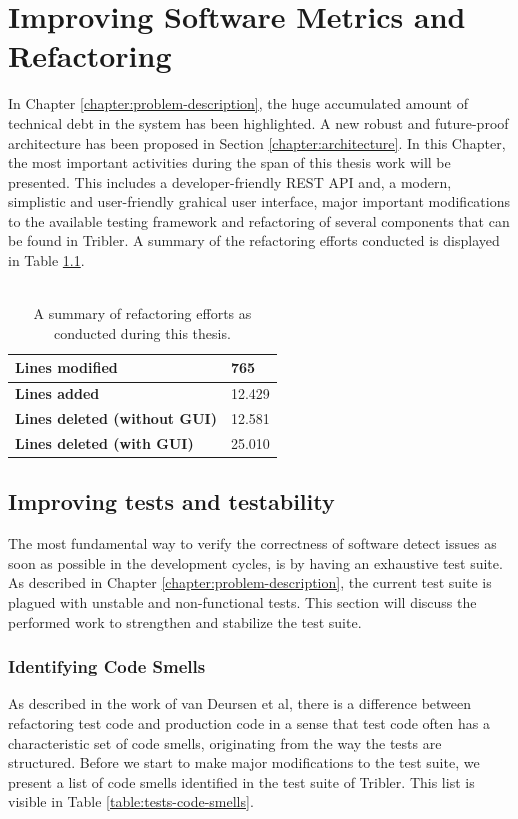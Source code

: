 \label{chapter:refactoring}
\chapter{Improving Software Metrics and Refactoring}
In Chapter \ref{chapter:problem-description}, the huge accumulated amount of technical debt in the system has been highlighted. A new robust and future-proof architecture has been proposed in Section \ref{chapter:architecture}. In this Chapter, the most important activities during the span of this thesis work will be presented. This includes a developer-friendly REST API and, a modern, simplistic and user-friendly grahical user interface, major important modifications to the available testing framework and refactoring of several components that can be found in Tribler. A summary of the refactoring efforts conducted is displayed in Table \ref{table:refactoring-summary}.\\\\

\begin{table}[h!]
	\centering
	\begin{tabular}{|l|l|}
		\hline
		\textbf{Lines modified} & 765 \\ \hline
		\textbf{Lines added} & 12.429 \\ \hline
		\textbf{Lines deleted (without GUI)} & 12.581 \\ \hline
		\textbf{Lines deleted (with GUI)} & 25.010 \\ \hline
	\end{tabular}
	\label{table:refactoring-summary}
	\caption{A summary of refactoring efforts as conducted during this thesis.}
\end{table}

\section{Improving tests and testability}
The most fundamental way to verify the correctness of software detect issues as soon as possible in the development cycles, is by having an exhaustive test suite. As described in Chapter \ref{chapter:problem-description}, the current test suite is plagued with unstable and non-functional tests. This section will discuss the performed work to strengthen and stabilize the test suite.

\subsection{Identifying Code Smells}
As described in the work of van Deursen et al\cite{van2001refactoring}, there is a difference between refactoring test code and production code in a sense that test code often has a characteristic set of code smells, originating from the way the tests are structured. Before we start to make major modifications to the test suite, we present a list of code smells identified in the test suite of Tribler. This list is visible in Table \ref{table:tests-code-smells}.

